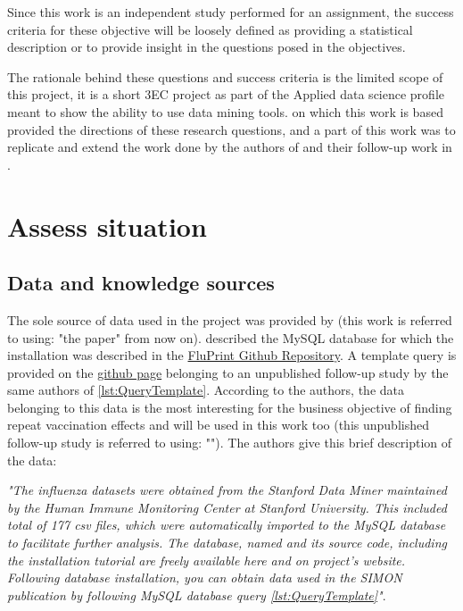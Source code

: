 Since this work is an independent study performed for an assignment, the success criteria for these objective will be loosely defined as providing a statistical description or to provide insight in the questions posed in the objectives.

The rationale behind these questions and success criteria is the limited scope of this project, it is a short 3EC project as part of the Applied data science profile meant to show the ability to use data mining tools.
\Dpaper on which this work is based provided the directions of these research questions, and a part of this work was to replicate and extend the work done by the authors of \flup and their follow-up work in \spaper.

\section{Assess situation}

\subsection{Data and knowledge sources}

The sole source of data used in the project was provided by \cite{tomicFluPRINTDatasetMultidimensional2019} (this work is referred to using: "the \flup paper" from now on).
\Dpaper described the MySQL database for which the installation was described in the \href{https://github.com/LogIN-/fluprint}{FluPrint Github Repository}.
A template query is provided on the \href{https://github.com/LogIN-/simon-manuscript}{github page} belonging to an unpublished follow-up study by the same authors of \dpaper
\autoref{lst:QueryTemplate}.
According to the authors, the data belonging to this data is the most interesting for the business objective of finding repeat vaccination effects and will be used in this work too (this unpublished follow-up study is referred to using: "\spaper").
The authors give this brief description of the data:

\begin{displayquote}
    \textit{"The influenza datasets were obtained from the Stanford Data Miner maintained by
    the Human Immune Monitoring Center at Stanford University. This included
    total of 177 csv files, which were automatically imported to the MySQL
    database to facilitate further analysis. The database, named \flup and
    its source code, including the installation tutorial are freely available
    here and on project's website. Following database installation, you can
    obtain data used in the SIMON publication by following MySQL database
    query \autoref{lst:QueryTemplate}"}.
\end{displayquote}

